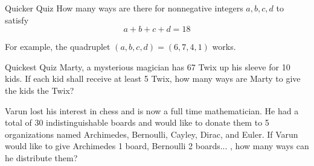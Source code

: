 \documentclass[aspectratio=169,xcolor=dvipsnames]{beamer}
\begin{document}
\begin{frame}[t]{Quicker Quiz}
    How many ways are there for nonnegative integers $a,b,c,d$ to satisfy \[a+b+c+d=18\]  
    
    \vspace{2cm}
    
    For example, the quadruplet $(a,b,c,d)=(6,7,4,1)$ works.
\end{frame}


\begin{frame}[t]{Quickest Quiz}
    Marty, a mysterious magician has 67 Twix up his sleeve for 10 kids. If each kid shall receive at least 5 Twix, how many ways are Marty to give the kids the Twix?
    \vspace{2cm}
    
    Varun lost his interest in chess and is now a full time mathematician. He had a total of 30 indistinguishable boards and would like to donate them to 5 organizations named Archimedes, Bernoulli, Cayley, Dirac, and Euler. If Varun would like to give Archimedes 1 board, Bernoulli 2 boards... , how many ways can he distribute them?
\end{frame}
\end{document}
